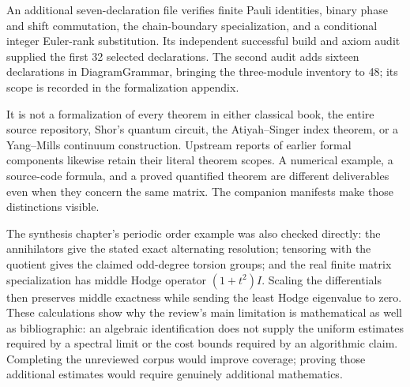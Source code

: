 An additional seven-declaration file verifies finite Pauli identities,
binary phase and shift commutation, the chain-boundary specialization, and
a conditional integer Euler-rank substitution. Its independent successful
build and axiom audit supplied the first 32 selected declarations. The
second audit adds sixteen declarations in DiagramGrammar, bringing the
three-module inventory to 48; its scope is recorded in the formalization appendix.

It is not a formalization of every theorem in either classical book, the
entire source repository, Shor's quantum circuit, the Atiyah--Singer index
theorem, or a Yang--Mills continuum construction. Upstream reports of earlier
formal components likewise retain their literal theorem scopes. A numerical
example, a source-code formula, and a proved quantified theorem are different
deliverables even when they concern the same matrix. The companion manifests
make those distinctions visible.

The synthesis chapter's periodic order example was also checked directly:
the annihilators give the stated exact alternating resolution; tensoring
with the quotient gives the claimed odd-degree torsion groups; and the
real finite matrix specialization has middle Hodge operator
\((1+t^2)I\). Scaling the differentials then preserves middle exactness
while sending the least Hodge eigenvalue to zero. These calculations show
why the review's main limitation is mathematical as well as bibliographic:
an algebraic identification does not supply the uniform estimates required
by a spectral limit or the cost bounds required by an algorithmic claim.
Completing the unreviewed corpus would improve coverage; proving those
additional estimates would require genuinely additional mathematics.
